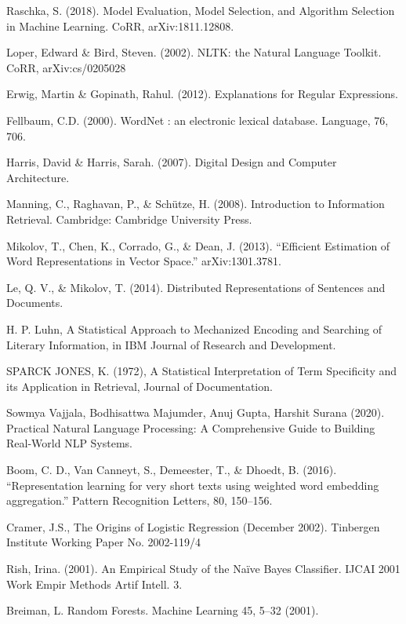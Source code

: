 \documentclass[conference]{IEEEtran}
\begin{document}
\begin{thebibliography}{00}
Raschka, S. (2018). Model Evaluation, Model Selection, and Algorithm Selection in Machine Learning. CoRR, arXiv:1811.12808.

Loper, Edward \& Bird, Steven. (2002). NLTK: the Natural Language Toolkit. CoRR, arXiv:cs/0205028

Erwig, Martin \& Gopinath, Rahul. (2012). Explanations for Regular Expressions.

Fellbaum, C.D. (2000). WordNet : an electronic lexical database. Language, 76, 706.

Harris, David \& Harris, Sarah. (2007). Digital Design and Computer Architecture. 

Manning, C., Raghavan, P., \& Schütze, H. (2008). Introduction to Information Retrieval. Cambridge: Cambridge University Press.

Mikolov, T., Chen, K., Corrado, G., \& Dean, J. (2013). “Efficient Estimation of Word Representations in Vector Space.” arXiv:1301.3781.

Le, Q. V., \& Mikolov, T. (2014). Distributed Representations of Sentences and Documents.

H. P. Luhn, A Statistical Approach to Mechanized Encoding and Searching of Literary Information, in IBM Journal of Research and Development.

SPARCK JONES, K. (1972), A Statistical Interpretation of Term Specificity and its Application in Retrieval, Journal of Documentation.

Sowmya Vajjala, Bodhisattwa Majumder, Anuj Gupta, Harshit Surana (2020). Practical Natural Language Processing: A Comprehensive Guide to Building Real-World NLP Systems.

Boom, C. D., Van Canneyt, S., Demeester, T., \& Dhoedt, B. (2016). “Representation learning for very short texts using weighted word embedding aggregation.” Pattern Recognition Letters, 80, 150–156.

Cramer, J.S., The Origins of Logistic Regression (December 2002). Tinbergen Institute Working Paper No. 2002-119/4

Rish, Irina. (2001). An Empirical Study of the Naïve Bayes Classifier. IJCAI 2001 Work Empir Methods Artif Intell. 3.

Breiman, L. Random Forests. Machine Learning 45, 5–32 (2001).


\end{thebibliography}
\end{document}
